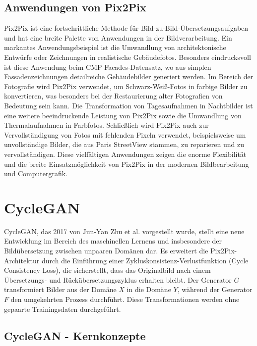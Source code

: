 

\subsection{Anwendungen von Pix2Pix}
Pix2Pix ist eine fortschrittliche Methode für Bild-zu-Bild-Übersetzungsaufgaben und hat eine breite Palette von Anwendungen in der Bildverarbeitung.\newline
Ein markantes Anwendungsbeispiel ist die Umwandlung von architektonische Entwürfe oder Zeichnungen in realistische Gebäudefotos. Besonders eindrucksvoll ist diese Anwendung beim CMP Facades-Datensatz, wo aus simplen Fassadenzeichnungen detailreiche Gebäudebilder generiert werden. \cite{PhillipIsola.}
\newline
Im Bereich der Fotografie wird Pix2Pix verwendet, um Schwarz-Weiß-Fotos in farbige Bilder zu konvertieren, was besonders bei der Restaurierung alter Fotografien von Bedeutung sein kann.
\newline
Die Transformation von Tagesaufnahmen in Nachtbilder ist eine weitere beeindruckende Leistung von Pix2Pix sowie die Umwandlung von Thermalaufnahmen in Farbfotos.
\newline
Schließlich wird Pix2Pix auch zur Vervollständigung von Fotos mit fehlenden Pixeln verwendet, beispielsweise um unvollständige Bilder, die aus Paris StreetView stammen, zu reparieren und zu vervollständigen.
\newline
Diese vielfältigen Anwendungen zeigen die enorme Flexibilität und die breite Einsatzmöglichkeit von Pix2Pix in der modernen Bildbearbeitung und Computergrafik.
 

\section{CycleGAN}
CycleGAN, das 2017 von Jun-Yan Zhu et al. vorgestellt wurde, stellt eine neue Entwicklung im Bereich des maschinellen Lernens und insbesondere der Bildübersetzung zwischen unpaaren Domänen dar. Es erweitert die Pix2Pix-Architektur durch die Einführung einer Zykluskonsistenz-Verlustfunktion (Cycle Consistency Loss), die sicherstellt, dass das Originalbild nach einem Übersetzungs- und Rückübersetzungszyklus erhalten bleibt. Der Generator $G$ transformiert Bilder aus der Domäne $X$ in die Domäne $Y$, während der Generator $F$ den umgekehrten Prozess durchführt. Diese Transformationen werden ohne gepaarte Trainingsdaten durchgeführt.

\subsection{CycleGAN - Kernkonzepte}


